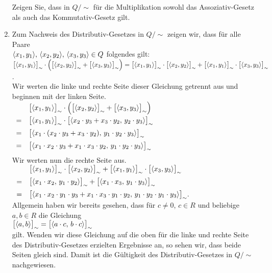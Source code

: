 \begin{enumerate}
      \exercise
      Zeigen Sie, dass in $Q/\!\sim$ für die Multiplikation sowohl das Assoziativ-Gesetz als auch das
      Kommutativ-Gesetz gilt.
\item Zum Nachweis des Distributiv-Gesetzes in $Q/\!\sim$ 
      zeigen wir, dass für alle Paare \\
      $\pair(x_1,y_1),\, \pair(x_2,y_2),\, \pair(x_3,y_3) \in Q$
      folgendes gilt:
      \\[0.2cm]
      \hspace*{0.3cm}
      $
      \bpr(x_1,y_1) \cdot \Bigl(\bpr(x_2,y_2) + \bpr(x_3,y_3)\Bigr) =
      \bpr(x_1,y_1) \cdot \bpr(x_2,y_2) + \bpr(x_1,y_1) \cdot \bpr(x_3,y_3)
      $.
      \\[0.2cm]
      Wir werten die linke und rechte Seite dieser Gleichung getrennt aus und beginnen mit der
      linken Seite. 
      \\[0.2cm]
      \hspace*{1.3cm}
      $
      \begin{array}[t]{cl}
        & \bpr(x_1,y_1) \cdot \Bigl(\bpr(x_2,y_2) + \bpr(x_3,y_3)\Bigr)                     \\[0.2cm]
      = & \bpr(x_1,y_1) \cdot \bpr(x_2 \cdot y_3 + x_3 \cdot y_2,\,y_2 \cdot y_3)           \\[0.2cm]
      = & \bpr(x_1 \cdot \kla x_2 \cdot y_3 + x_3 \cdot y_2\klz,\,y_1 \cdot y_2 \cdot y_3)  \\[0.2cm]
      = & \bpr(x_1 \cdot x_2 \cdot y_3 + x_1 \cdot x_3 \cdot y_2,\,y_1 \cdot y_2 \cdot y_3) \\[0.2cm]
      \end{array}
      $
      \\[0.2cm]
      Wir werten nun die rechte Seite aus.
      \\[0.2cm]
      \hspace*{1.3cm}
      $
      \begin{array}[t]{cl}
      & \bpr(x_1,y_1) \cdot \bpr(x_2,y_2) + \bpr(x_1,y_1) \cdot \bpr(x_3,y_3)        \\[0.2cm]
      = & \bpr(x_1 \cdot x_2,\, y_1 \cdot y_2) + \bpr(x_1 \cdot x_3,\,y_1 \cdot y_3)   \\[0.2cm]
      = & \bpr(x_1 \cdot x_2 \cdot y_1 \cdot y_3 + x_1 \cdot x_3 \cdot y_1 \cdot y_2,\, 
      y_1 \cdot y_2 \cdot y_1 \cdot y_3). 
      \end{array}
      $
      \\[0.2cm]
      Allgemein haben wir bereits gesehen, dass für $c \not= 0$, $c \in R$ und beliebige $a,b \in R$ die Gleichung
      \\[0.2cm]
      \hspace*{1.3cm}
      $\bpr(a,b) = \bpr(a \cdot c,\,b \cdot c)$
      \\[0.2cm]
      gilt.  Wenden wir diese Gleichung  auf die oben für die linke und rechte Seite des
      Distributiv-Gesetzes erzielten Ergebnisse an, so sehen wir, dass beide Seiten gleich sind.
      Damit ist die Gültigkeit des Distributiv-Gesetzes in $Q/\!\sim$ nachgewiesen.  
\end{enumerate}
